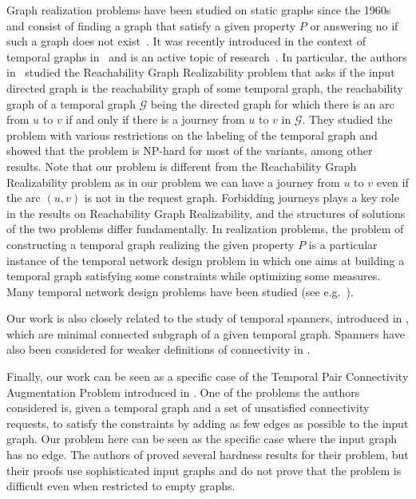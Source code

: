 \documentclass[11pt]{article}%
\newcommand{\G}{\mathcal{G}}
\begin{document}
Graph realization problems have been studied on static graphs since the 1960s and consist of finding a graph that satisfy a given property $P$ or answering no if such a graph does not exist~\cite{erdos1960,hakimi1965}. It was recently introduced in the context of temporal graphs in~\cite{klobas2024} and is an active topic of research~\cite{casteigts2025,cauvi2025,erlebach2025,erlebach2024,mertzios2025,mertzios2025-2,meusel2025}. In particular, the authors in~\cite{erlebach2025} studied the Reachability Graph Realizability problem that asks if the input directed graph is the reachability graph of some temporal graph, the reachability graph of a temporal graph $\G$ being the directed graph for which there is an arc from $u$ to $v$ if and only if there is a journey from $u$ to $v$ in $\G$. They studied the problem with various restrictions on the labeling of the temporal graph and showed that the problem is NP-hard for most of the variants, among other results. Note that our problem is different from the Reachability Graph Realizability problem as in our problem we can have a journey from $u$ to $v$ even if the arc $(u,v)$ is not in the request graph. Forbidding journeys plays a key role in the results on Reachability Graph Realizability, and the structures of solutions of the two problems differ fundamentally. 
In realization problems, the problem of constructing a temporal graph realizing the given property $P$ is a particular instance of the temporal network design problem in which one aims at building a temporal graph satisfying some constraints while optimizing some measures. Many temporal network design problems have been studied (see e.g.~\cite{akrida2017,deligkas2022,enright2021,klobas2024-2,mertzios2013}). 

Our work is also closely related to the study of temporal spanners, introduced in \cite{kempe2002}, which are minimal connected subgraph of a given temporal graph. Spanners have also been considered for weaker definitions of connectivity in \cite{kurita_et_al:LIPIcs.SAND.2025.9}.

Finally, our work can be seen as a specific case of the Temporal Pair Connectivity Augmentation Problem introduced in \cite{bellitto_et_al:LIPIcs.SAND.2025.3}. One of the problems the authors considered is, given a temporal graph and a set of unsatisfied connectivity requests, to satisfy the constraints by adding as few edges as possible to the input graph. Our problem here can be seen as the specific case where the input graph has no edge. The authors of \cite{bellitto_et_al:LIPIcs.SAND.2025.3} proved several hardness results for their problem, but their proofs use sophisticated input graphs and do not prove that the problem is difficult even when restricted to empty graphs.
\end{document}
